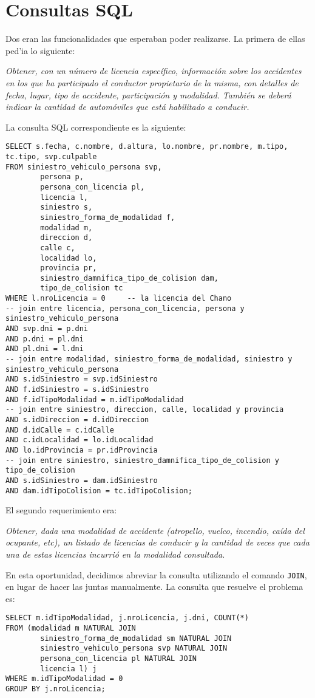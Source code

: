 \section{Consultas SQL}

Dos eran las funcionalidades que esperaban poder realizarse. La primera de ellas ped'ia lo siguiente:

\textit{Obtener, con un número de licencia específico,
información sobre los accidentes en los que ha participado el conductor propietario de
la misma, con detalles de fecha, lugar, tipo de accidente, participación y modalidad.
También se deberá indicar la cantidad de automóviles que está habilitado a conducir.}

La consulta SQL correspondiente es la siguiente:

\begin{verbatim}
SELECT s.fecha, c.nombre, d.altura, lo.nombre, pr.nombre, m.tipo, tc.tipo, svp.culpable
FROM siniestro_vehiculo_persona svp,
        persona p, 
        persona_con_licencia pl, 
        licencia l, 
        siniestro s,
        siniestro_forma_de_modalidad f, 
        modalidad m, 
        direccion d, 
        calle c, 
        localidad lo, 
        provincia pr, 
        siniestro_damnifica_tipo_de_colision dam, 
        tipo_de_colision tc
WHERE l.nroLicencia = 0		-- la licencia del Chano
-- join entre licencia, persona_con_licencia, persona y siniestro_vehiculo_persona
AND svp.dni = p.dni
AND p.dni = pl.dni
AND pl.dni = l.dni
-- join entre modalidad, siniestro_forma_de_modalidad, siniestro y siniestro_vehiculo_persona
AND s.idSiniestro = svp.idSiniestro
AND f.idSiniestro = s.idSiniestro
AND f.idTipoModalidad = m.idTipoModalidad
-- join entre siniestro, direccion, calle, localidad y provincia
AND s.idDireccion = d.idDireccion
AND d.idCalle = c.idCalle
AND c.idLocalidad = lo.idLocalidad
AND lo.idProvincia = pr.idProvincia
-- join entre siniestro, siniestro_damnifica_tipo_de_colision y tipo_de_colision
AND s.idSiniestro = dam.idSiniestro
AND dam.idTipoColision = tc.idTipoColision;
\end{verbatim}

El segundo requerimiento era:

\textit{Obtener, dada una modalidad de accidente (atropello, vuelco, incendio, caída del ocupante, etc), un listado de licencias de conducir y la cantidad de veces que cada una de estas licencias incurrió en la modalidad consultada.}

En esta oportunidad, decidimos abreviar la consulta utilizando el comando \texttt{JOIN}, en lugar de hacer las juntas manualmente. La consulta que resuelve el problema es:

\begin{verbatim}
SELECT m.idTipoModalidad, j.nroLicencia, j.dni, COUNT(*)
FROM (modalidad m NATURAL JOIN 
        siniestro_forma_de_modalidad sm NATURAL JOIN 
        siniestro_vehiculo_persona svp NATURAL JOIN 
        persona_con_licencia pl NATURAL JOIN 
        licencia l) j
WHERE m.idTipoModalidad = 0
GROUP BY j.nroLicencia;
\end{verbatim}